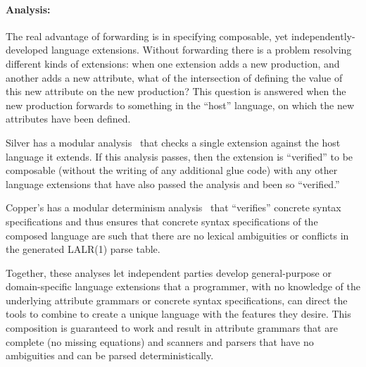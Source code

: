 \paragraph{Analysis:}
The real advantage of forwarding is in specifying composable, yet
independently-developed language extensions.
%
Without forwarding there is a problem resolving different kinds of
extensions: when one extension adds a new production, and another adds
a new attribute, what of the intersection of defining the value of
this new attribute on the new production?  This question is answered
when the new production forwards to something in the ``host''
language, on which the new attributes have been defined.
%

Silver has a modular analysis~\cite{kaminski12sle} that checks a
single extension against the host language it extends.  If this
analysis passes, then the extension is ``verified'' to be composable
(without the writing of any additional glue code) with any other
language extensions that have also passed the analysis and been so
``verified.'' 

Copper's has a modular determinism analysis~\cite{schwerdfeger09pldi}
that ``verifies'' concrete syntax specifications and thus ensures that
concrete syntax specifications of the composed language are such that
there are no lexical ambiguities or conflicts in the generated LALR(1)
parse table.

Together, these analyses let independent parties develop
general-purpose or domain-specific language extensions that a
programmer, with no knowledge of the underlying attribute grammars or
concrete syntax specifications, can direct the tools to combine to
create a unique language with the features they desire.  This
composition is guaranteed to work and result in attribute grammars
that are complete (no missing equations) and scanners and parsers that
have no ambiguities and can be parsed deterministically.


